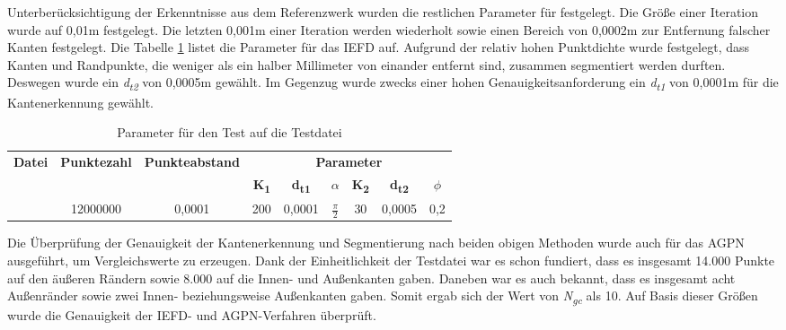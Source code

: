 Unterberücksichtigung der Erkenntnisse aus dem Referenzwerk wurden die restlichen Parameter für \testcloud festgelegt. Die Größe einer Iteration wurde auf 0,01m festgelegt. Die letzten 0,001m einer Iteration werden wiederholt sowie einen Bereich von 0,0002m zur Entfernung falscher Kanten festgelegt. Die Tabelle \ref{table: parameters_test1} listet die Parameter für das IEFD auf. Aufgrund der relativ hohen Punktdichte wurde festgelegt, dass Kanten und Randpunkte, die weniger als ein halber Millimeter von einander entfernt sind, zusammen segmentiert werden durften. Deswegen wurde ein \textit{d\textsubscript{t2}} von 0,0005m gewählt. Im Gegenzug wurde zwecks einer hohen Genauigkeitsanforderung ein \textit{d\textsubscript{t1}} von 0,0001m für die Kantenerkennung gewählt.

\begin{table}
	\centering
	\begin{tabular}[width=\textwidth]{l *{8}{c}}
		\hline
		\multirow{2}{*}{\textbf{Datei}}&\multirow{2}{*}{\textbf{Punktezahl}}&\multirow{2}{*}{\textbf{Punkteabstand}}&\multicolumn{6}{c}{\textbf{Parameter}}\\
		& & & \textbf{K\textsubscript{1}} & \textbf{d\textsubscript{t1}} & \textbf{$\alpha$} & \textbf{K\textsubscript{2}} & \textbf{d\textsubscript{t2}} & \textbf{$\phi$} \\
		\hline
		\testcloud & 12000000 & 0,0001 & 200 & 0,0001 & $\frac{\pi}{2}$ & 30 & 0,0005 & 0,2 \\
		\hline
	\end{tabular}
	\caption{Parameter für den Test auf die Testdatei}
	\label{table: parameters_test1}
\end{table}

Die Überprüfung der Genauigkeit der Kantenerkennung und Segmentierung nach beiden obigen Methoden wurde auch für das AGPN ausgeführt, um Vergleichswerte zu erzeugen. Dank der Einheitlichkeit der Testdatei war es schon fundiert, dass es insgesamt 14.000 Punkte auf den äußeren Rändern sowie 8.000 auf die Innen- und Außenkanten gaben. Daneben war es auch bekannt, dass es insgesamt acht Außenränder sowie zwei Innen- beziehungsweise Außenkanten gaben. Somit ergab sich der Wert von \textit{N\textsubscript{gc}} als 10. Auf Basis dieser Größen wurde die Genauigkeit der IEFD- und AGPN-Verfahren überprüft.

